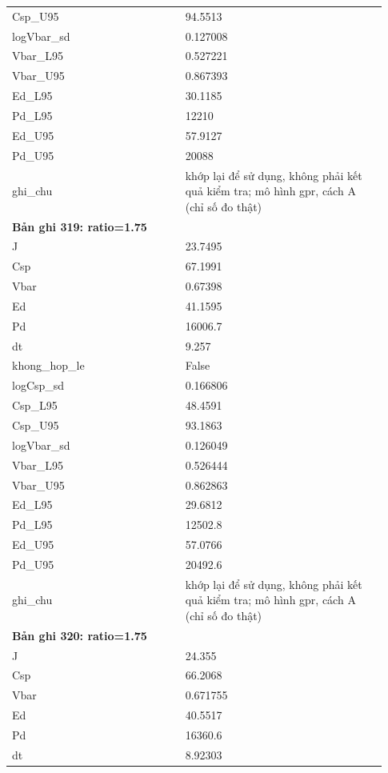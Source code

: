 \begin{longtable}{p{0.43\linewidth}p{0.50\linewidth}}
Csp\_\allowbreak U95 & 94.5513 \\
logVbar\_\allowbreak sd & 0.127008 \\
Vbar\_\allowbreak L95 & 0.527221 \\
Vbar\_\allowbreak U95 & 0.867393 \\
Ed\_\allowbreak L95 & 30.1185 \\
Pd\_\allowbreak L95 & 12210 \\
Ed\_\allowbreak U95 & 57.9127 \\
Pd\_\allowbreak U95 & 20088 \\
ghi\_\allowbreak chu & khớp lại để sử dụng, không phải kết quả kiểm tra; mô hình gpr, cách A (chỉ số đo thật) \\
\midrule
\multicolumn{2}{p{0.95\linewidth}}{\textbf{Bản ghi 319: ratio=1.75}} \\
J & 23.7495 \\
Csp & 67.1991 \\
Vbar & 0.67398 \\
Ed & 41.1595 \\
Pd & 16006.7 \\
dt & 9.257 \\
khong\_\allowbreak hop\_\allowbreak le & False \\
logCsp\_\allowbreak sd & 0.166806 \\
Csp\_\allowbreak L95 & 48.4591 \\
Csp\_\allowbreak U95 & 93.1863 \\
logVbar\_\allowbreak sd & 0.126049 \\
Vbar\_\allowbreak L95 & 0.526444 \\
Vbar\_\allowbreak U95 & 0.862863 \\
Ed\_\allowbreak L95 & 29.6812 \\
Pd\_\allowbreak L95 & 12502.8 \\
Ed\_\allowbreak U95 & 57.0766 \\
Pd\_\allowbreak U95 & 20492.6 \\
ghi\_\allowbreak chu & khớp lại để sử dụng, không phải kết quả kiểm tra; mô hình gpr, cách A (chỉ số đo thật) \\
\midrule
\multicolumn{2}{p{0.95\linewidth}}{\textbf{Bản ghi 320: ratio=1.75}} \\
J & 24.355 \\
Csp & 66.2068 \\
Vbar & 0.671755 \\
Ed & 40.5517 \\
Pd & 16360.6 \\
dt & 8.92303 \\

\end{longtable}
